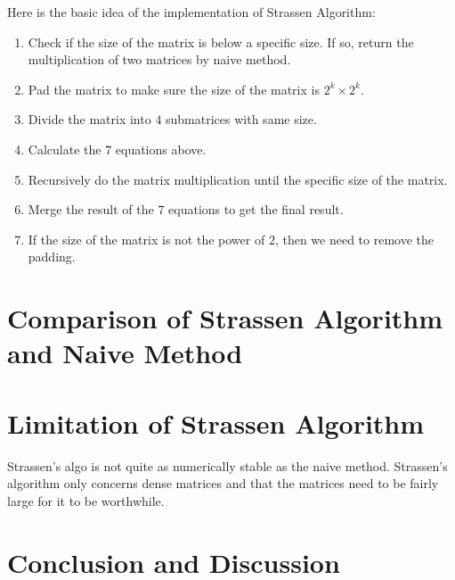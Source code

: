 \documentclass{article}
\begin{document}
Here is the basic idea of the implementation of Strassen Algorithm:
\begin{enumerate}
    \item Check if the size of the matrix is below a specific size. If so, return the multiplication of two matrices by naive method.
    \item Pad the matrix to make sure the size of the matrix is $2^k \times 2^k$.
    \item Divide the matrix into $4$ submatrices with same size.
    \item Calculate the $7$ equations above.
    \item Recursively do the matrix multiplication until the specific size of the matrix.
    \item Merge the result of the $7$ equations to get the final result.
    \item If the size of the matrix is not the power of $2$, then we need to remove the padding.
\end{enumerate}

\section{Comparison of Strassen Algorithm and Naive Method}

\section{Limitation of Strassen Algorithm}
Strassen's algo is not quite as numerically stable as the naive method. Strassen's algorithm only concerns dense matrices and that the matrices need to be fairly large for it to be worthwhile.

\section{Conclusion and Discussion}
\end{document}
